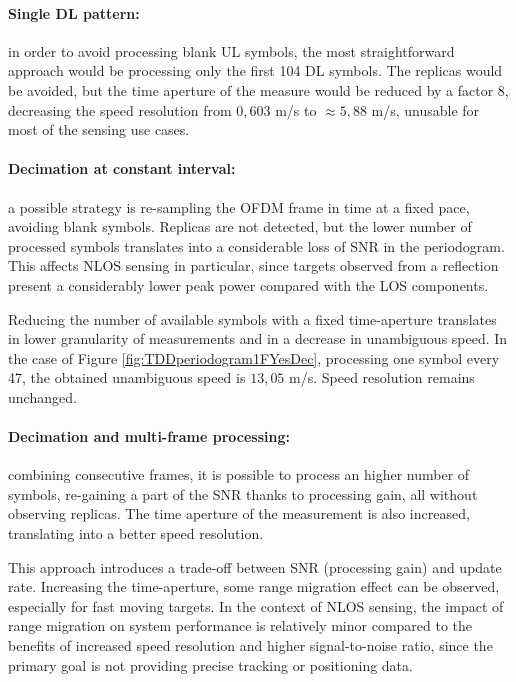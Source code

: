     \paragraph{Single DL pattern:}
    in order to avoid processing blank UL symbols, the most straightforward approach would be processing only the first 104 DL symbols. The replicas would be avoided, but the time aperture of the measure would be reduced by a factor 8, decreasing the speed resolution from $0,603$ m/s to $\approx 5,88$ m/s, unusable for most of the sensing use cases.
    
    \paragraph{Decimation at constant interval:}
     a possible strategy is re-sampling the OFDM frame in time at a fixed pace, avoiding blank symbols. Replicas are not detected, but the lower number of processed symbols translates into a considerable loss of SNR in the periodogram. This affects NLOS sensing in particular, since targets observed from a reflection present a considerably lower peak power compared with the LOS components.

     Reducing the number of available symbols with a fixed time-aperture translates in lower granularity of measurements and in a decrease in unambiguous speed. \protect\newline In the case of Figure \ref{fig:TDDperiodogram1FYesDec}, processing one symbol every 47, the obtained unambiguous speed is $13,05$ m/s. \protect\newline Speed resolution remains unchanged.
    
     \paragraph{Decimation and multi-frame processing:}
     combining consecutive frames, it is possible to process an higher number of symbols, re-gaining a part of the SNR thanks to processing gain, all without observing replicas. The time aperture of the measurement is also increased, translating into a better speed resolution.

     This approach introduces a trade-off between SNR (processing gain) and update rate. Increasing the time-aperture, some range migration effect can be observed, especially for fast moving targets. In the context of NLOS sensing, the impact of range migration on system performance is relatively minor compared to the benefits of increased speed resolution and higher signal-to-noise ratio, since the primary goal is not providing precise tracking or positioning data.


